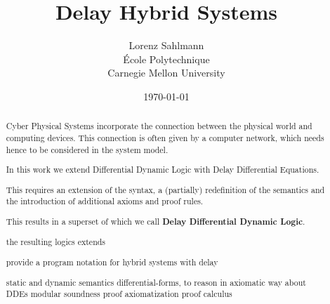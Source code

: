 \documentclass[10pt,draft]{report}
\begin{document}
\title{Delay Hybrid Systems}

\author{Lorenz Sahlmann\\ École Polytechnique\\ Carnegie Mellon University}
\date{\today}

\maketitle

\begin{abstract}
    Cyber Physical Systems incorporate the connection between the physical world and computing devices.
    This connection is often given by a computer network, which needs hence to be considered in the system model.

    In this work we extend Differential Dynamic Logic with Delay Differential Equations.

    This requires an extension of the syntax, a (partially) redefinition of the semantics and the introduction of additional axioms and proof rules.

    This results in a superset of \dL which we call \textbf{Delay Differential Dynamic Logic}.

    the resulting logics extends

    provide a program notation for hybrid systems with delay

    static and dynamic semantics
    differential-forms, to reason in axiomatic way about DDEs
    modular soundness proof
    axiomatization
    proof calculus
\end{abstract}


%



%





%




\nocite{Fulton16LogicProofs,*}


\end{document}
